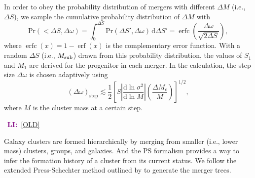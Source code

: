 \documentclass[modern]{aastex61}
\newcommand{\R}[1]{\mathrm{#1}}
\newcommand{\D}[1]{\R{d} #1}
\newcommand{\diff}[2]{\frac{\D{#1}}{\D{#2}}}
\newcommand{\LI}[1]{\textcolor{purple}{\textbf{LI:}}~\uline{#1}}
\DeclareMathOperator{\erf}{erf}
\DeclareMathOperator{\erfc}{erfc}
\begin{document}
In order to obey the probability distribution of mergers with different
$\Delta M$ (i.e., $\Delta S$),
we sample the cumulative probability distribution of $\Delta M$ with
\begin{equation}
  \R{Pr}(<\!\Delta S, \Delta\omega) =
  \int_0^{\Delta S} \R{Pr}(\Delta S', \Delta\omega) \,\D{\Delta S'} =
  \erfc \!\left( \frac{\Delta \omega}{\sqrt{2 \Delta S}} \right),
\end{equation}
where $\erfc(x) = 1 - \erf(x)$ is the complementary error function.
With a random $\Delta S$ (i.e., $M_{\rm sub}$) drawn from this probability
distribution, the values of $S_1$ and $M_{1}$
are derived for the progenitor in each merger.
In the calculation, the step size $\Delta\omega$ is chosen adaptively
\citep{randall2002} using
\begin{equation}
  (\Delta\omega)_{\R{step}} \lesssim \frac{1}{2} \left[
    S \left| \diff{\ln \sigma^2}{\ln M} \right|
    \left( \frac{\Delta M_c}{M} \right) \right]^{1/2},
\end{equation}
where $M$ is the cluster mass at a certain step.

\noindent\hrulefill~\LI{[OLD]}~\hrulefill

Galaxy clusters are formed hierarchically by merging from smaller (i.e.,
lower mass) clusters, groups, and galaxies.
And the PS formalism provides a way to infer the formation history
of a cluster from its current status.
We follow the extended Press-Schechter method outlined by \citet{lacey1993}
to generate the merger trees.
\end{document}
